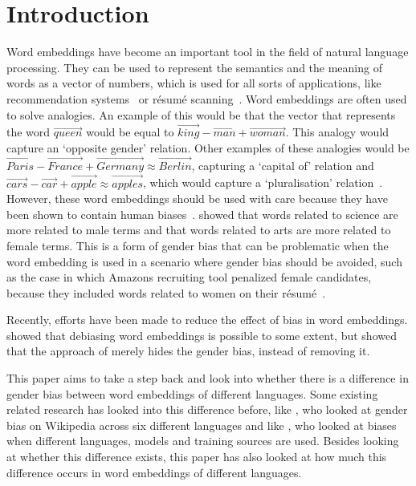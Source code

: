 \section{Introduction}
Word embeddings have become an important tool in the field of natural language
processing. They can be used to represent the semantics and the meaning of
words as a vector of numbers, which is used for all sorts of applications, like
recommendation systems~\parencite{10.1145/3219819.3219885} or résumé
scanning~\parencite{large-scale-hoang-2017}. Word
embeddings are often used to solve analogies. An example of this would be that the
vector that represents the word
$\overrightarrow{queen}$ would be equal to $\overrightarrow{king} -
\overrightarrow{man} +
\overrightarrow{woman}$. This analogy would capture an `opposite gender' relation.
Other examples of these analogies would be $\overrightarrow{Paris} -
\overrightarrow{France} + \overrightarrow{Germany} \approx \overrightarrow{Berlin}$,
capturing a `capital of' relation and
$\overrightarrow{cars} - \overrightarrow{car} + \overrightarrow{apple} \approx
\overrightarrow{apples}$, which would capture a `pluralisation' relation~\parencite{vylomova-etal-2016-take}.
However, these word embeddings should be used with care because they have been
shown to contain human
biases~\parencite{caliskan_2017_semantics_language_corpora}.
\textcite{caliskan_2017_semantics_language_corpora} showed
that words related to science are more related to male terms and that
words related to arts are more related to female terms. This is a form of gender bias
that can be problematic when the word embedding is used in a scenario where gender bias
should be avoided, such as
the case in which Amazons recruiting tool penalized female candidates, because they
included words related to women on their résumé~\parencite{dastin_2018}.

Recently, efforts have been made to reduce the effect of bias in word embeddings.
\textcite{bolukbasi_2016_quantifying_stereotypes} showed that debiasing word embeddings
is possible to some extent, but \textcite{gonen-goldberg-2019-lipstick-pig} showed that
the approach of \textcite{bolukbasi_2016_quantifying_stereotypes} merely hides the
gender bias, instead of removing it.

This paper aims to take a step back and look into whether there is a difference in gender
bias between word embeddings of different languages. Some existing related research has
looked into this difference before, like \textcite{2015arXiv150106307W}, who looked at
gender bias on Wikipedia across six different languages and like \textcite{lauscher-glavas-2019-consistently}, who looked at biases when different languages, models and training
sources are used.
Besides looking at whether this difference exists, this paper has also looked at how much
this difference occurs in word embeddings of different languages.

